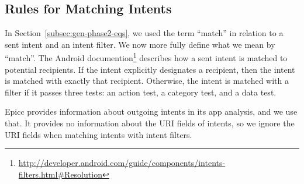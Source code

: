 \subsection{Rules for Matching Intents} \label{subsec:intent-resolution-rules}
In Section~\ref{subsec:gen-phase2-eqs}, we used the term
``match'' in relation to a sent intent and an intent filter.  We now more
fully define what we mean by ``match''.
The Android
documention\footnote{\url{http://developer.android.com/guide/components/intents-filters.html\#Resolution}}
describes how a sent intent is matched to potential recipients.
If the intent explicitly designates a recipient, then the intent is
matched with exactly that recipient.  Otherwise, the intent is matched with a
filter if it passes three tests: an action test, a category test, and a data
test. 

Epicc provides information about outgoing intents in its app analysis, and we use that. 
It provides no information about the URI
fields of intents, so we ignore the URI fields when matching intents with
intent filters. 


